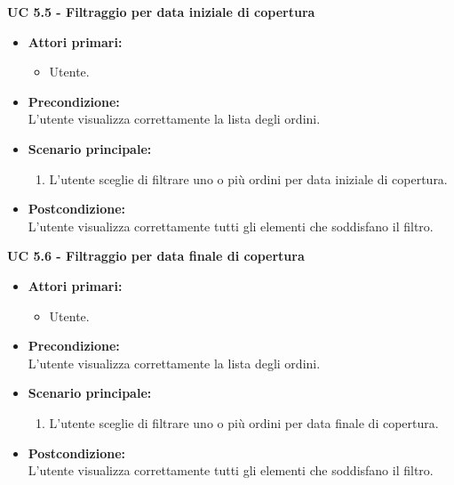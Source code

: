 \vspace{0.4cm}

\noindent \textbf{\large UC 5.5 - Filtraggio per data iniziale di copertura}
\label{uc:filtraggio-data-iniziale-copertura}
\begin{itemize}

	\item \textbf{Attori primari: }
		\begin{itemize}
			\item Utente.
		\end{itemize}

	\item \textbf{Precondizione: }\\[0.3cm]
		L'utente visualizza correttamente la lista degli ordini.

	\item \textbf{Scenario principale: }
		\begin{enumerate}
			\item L'utente sceglie di filtrare uno o più ordini per data iniziale di copertura.
		\end{enumerate}
		

	\item \textbf{Postcondizione: }\\[0.3cm]
		L'utente visualizza correttamente tutti gli elementi che soddisfano il filtro.

\end{itemize}

\vspace{0.4cm}

\newpage

\noindent \textbf{\large UC 5.6 - Filtraggio per data finale di copertura}
\label{uc:filtraggio-data-finale-copertura}
\begin{itemize}

	\item \textbf{Attori primari: }
		\begin{itemize}
			\item Utente.
		\end{itemize}

	\item \textbf{Precondizione: }\\[0.3cm]
		L'utente visualizza correttamente la lista degli ordini.

	\item \textbf{Scenario principale: }
		\begin{enumerate}
			\item L'utente sceglie di filtrare uno o più ordini per data finale di copertura.
		\end{enumerate}
		

	\item \textbf{Postcondizione: }\\[0.3cm]
		L'utente visualizza correttamente tutti gli elementi che soddisfano il filtro.

\end{itemize}

